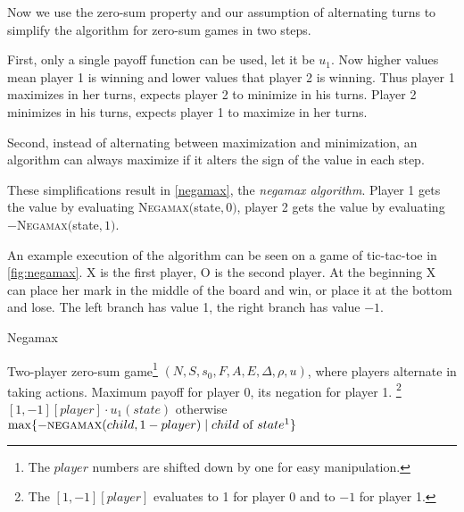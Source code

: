 Now we use the zero-sum property and our assumption of alternating turns
to simplify the algorithm for zero-sum games in two steps.

First, only a single payoff function can be used,
let it be $u_1$. Now higher values mean player 1 is winning and lower
values that player 2 is winning.
Thus player 1 maximizes in her turns, expects
player 2 to minimize in his turns.
Player 2 minimizes in his turns, expects
player 1 to maximize in her turns.

Second, instead of alternating between maximization and minimization, an
algorithm can always maximize if it alters the sign of the value in each
step.

These simplifications result in \autoref{negamax}, the {\em negamax
algorithm}.
Player 1 gets the value by evaluating
\textsc{Negamax}$($state$, 0)$,
player 2 gets the value by evaluating $-$\textsc{Negamax}$($state$, 1)$.

An example execution of the algorithm can be seen on a game of
tic-tac-toe in \autoref{fig:negamax}.
X is the first player, O is the second player. At the beginning X can
place her mark in the middle of the board and win, or place it at the
bottom and lose. The left branch has value 1, the right branch has value
$-1$.


\begin{algorithm}
\caption{Negamax}
\label{negamax}
\begin{algorithmic}
\Input Two-player zero-sum game\footnote{The $player$
numbers are shifted down by one for easy manipulation.}
$(N, S, s_0, F, A, E, \Delta, \rho, u)$, where players
 alternate in taking actions.
\Output Maximum payoff for player 0, its negation for player 1.
    \State \Return\footnote{The
    $[1,-1][player]$ evaluates to 1 for player 0 and to $-1$ for player 1.}
        $[1,-1][player] \cdot u_1(state)$
        otherwise
    \EndIf
    \State \Return $\max \{ - \Call{negamax}{child, 1 - player}
        \mid
        child \text{ of } state\footnote{Precisely
        for all enabled actions $a \in E(state)$ every $child \in \Delta(state, a)$.}
    \}$
\EndFunction
\end{algorithmic}
\end{algorithm}

